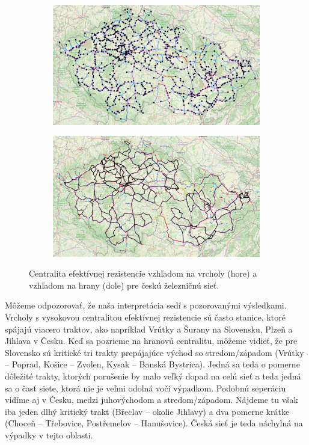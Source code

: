 \documentclass[main.tex]{subfiles}
\begin{document}
\begin{figure}
	\centering
	
	\begin{subfigure}{\linewidth}
		\centering
		\includegraphics[width=\textwidth]{images/cze_vertex_resistance.png}
	\end{subfigure}
	
	\vspace{0.5cm}
	
	\begin{subfigure}{\linewidth}
		\centering
		\includegraphics[width=\textwidth]{images/cze_edge_resistance.png}
	\end{subfigure}
	
	\caption{Centralita efektívnej rezistencie vzhľadom na vrcholy (hore) a vzhľadom na hrany (dole) pre českú železničnú sieť.}
	\label{fig:resistance_cze}
\end{figure}

Môžeme odpozorovať, že naša interpretácia sedí s pozorovanými výsledkami. Vrcholy s vysokovou centralitou efektívnej rezistencie sú často stanice, ktoré spájajú viacero traktov, ako napríklad Vrútky a Šurany na Slovensku, Plzeň a Jihlava v Česku. Keď sa pozrieme na hranovú centralitu, môžeme vidieť, že pre Slovensko sú kritické tri trakty prepájajúce východ so stredom/západom (Vrútky -- Poprad, Košice -- Zvolen, Kysak -- Banská Bystrica). Jedná sa teda o pomerne dôležité trakty, ktorých porušenie by malo veľký dopad na celú sieť a teda jedná sa o časť siete, ktorá nie je veľmi odolná voči výpadkom. Podobnú seperáciu vidíme aj v Česku, medzi juhovýchodom a stredom/západom. Nájdeme tu však iba jeden dlhý kritický trakt (Břeclav -- okolie Jihlavy) a dva pomerne krátke (Choceň -- Třebovice, Postřemelov -- Hanušovice). Česká sieť je teda náchylná na výpadky v tejto oblasti.
\end{document}
